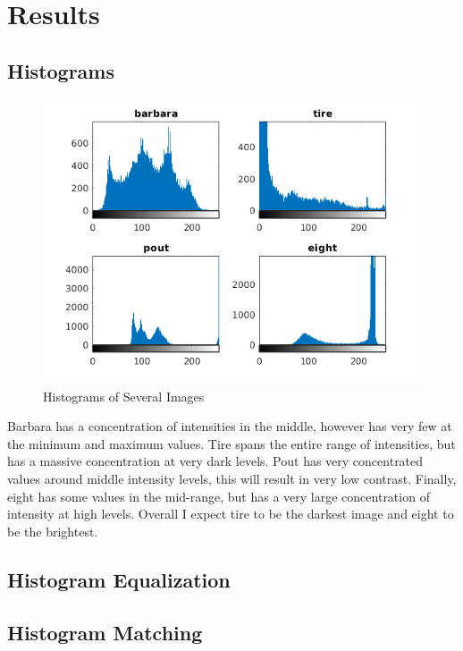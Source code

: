\section{Results}

\subsection{Histograms}

\begin{figure}
    \centering
    \includegraphics{histogram_compare.png}
    \caption{Histograms of Several Images}
\end{figure}

Barbara has a concentration of intensities in the middle, however has very few
at the minimum and maximum values. Tire spans the entire range of intensities,
but has a massive concentration at very dark levels. Pout has very concentrated
values around middle intensity levels, this will result in very low contrast.
Finally, eight has some values in the mid-range, but has a very large
concentration of intensity at high levels. Overall I expect tire to be the
darkest image and eight to be the brightest.

\subsection{Histogram Equalization}

\subsection{Histogram Matching}
